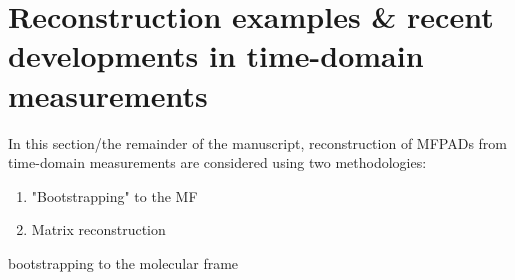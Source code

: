 \section{Reconstruction examples & recent developments in time-domain measurements}

In this section/the remainder of the manuscript, reconstruction of MFPADs from time-domain measurements are considered using two methodologies:

\begin{enumerate}
\item "Bootstrapping" to the MF\cite{hockett2018QMP1,hockett2018QMP2,marceau2017MolecularFrameReconstruction}
\item Matrix reconstruction
\end{enumerate}

bootstrapping to the molecular frame